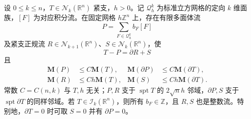\begin{theorem}\label{g3:thm:federer-fleming-deformation}
	设 \(0\le k\le n\)，\(T\in\mathcal N_k(\mathbb R^n)\) 紧支，\(h>0\)。记 \(\mathcal Q_h^k\) 为标准立方网格的定向 \(k\) 维面族，\([F]\) 为对应积分流。在固定网格 \(h\mathbb Z^n\) 上，存在有限多面体流
	\[
	P=\sum_{F\in\mathcal Q_h^k}b_F[F]
	\]
	及紧支正规流 \(R\in\mathcal N_{k+1}(\mathbb R^n)\)、\(S\in\mathcal N_k(\mathbb R^n)\)，使
	\begin{equation}\label{g3:eq:deformation-decomposition}
	T-P=\partial R+S
	\end{equation}
	且
	\begin{equation}\label{g3:eq:deformation-mass-bounds}
	\begin{aligned}
	\mathbf M(P)&\le C\mathbf M(T),&
	\mathbf M(\partial P)&\le C\mathbf M(\partial T),\\
	\mathbf M(R)&\le Ch\mathbf M(T),&
	\mathbf M(S)&\le Ch\mathbf M(\partial T).
	\end{aligned}
	\end{equation}
	常数 \(C=C(n,k)\) 与 \(T,h\) 无关；\(P,R\) 支于 \(\operatorname{spt}T\) 的 \(2\sqrt n h\) 邻域，\(\partial P,S\) 支于 \(\operatorname{spt}\partial T\) 的同样邻域。若 \(T\in\mathcal I_k(\mathbb R^n)\)，则所有 \(b_F\in\mathbb Z\)，且 \(R,S\) 也是整数流。特别地，\(\partial T=0\) 时可取 \(S=0\) 并有 \(\partial P=0\)。
\end{theorem}
